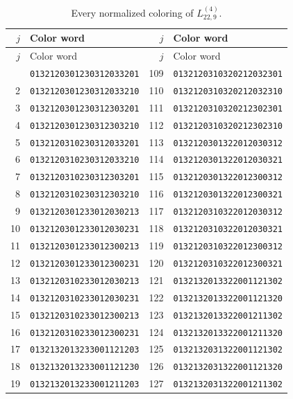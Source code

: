 \documentclass[aps,pra,reprint,superscriptaddress,longbibliography,nofootinbib,floatfix,10pt]{revtex4-2}
\theoremstyle{definition}
\begin{document}
\begin{longtable}{rl@{\qquad}rl}
\caption{Every normalized coloring of $L_{22,9}^{(4)}$.}\label{tab:colors-4f}\\\toprule $j$ & Color word & $j$ & Color word\\\midrule\endfirsthead
\toprule $j$ & Color word & $j$ & Color word\\\midrule\endhead\bottomrule\endfoot
1 & \texttt{0132120301230312033201} & 109 & \texttt{0132120310320212032301}\\
2 & \texttt{0132120301230312033210} & 110 & \texttt{0132120310320212032310}\\
3 & \texttt{0132120301230312303201} & 111 & \texttt{0132120310320212302301}\\
4 & \texttt{0132120301230312303210} & 112 & \texttt{0132120310320212302310}\\
5 & \texttt{0132120310230312033201} & 113 & \texttt{0132120301322012030312}\\
6 & \texttt{0132120310230312033210} & 114 & \texttt{0132120301322012030321}\\
7 & \texttt{0132120310230312303201} & 115 & \texttt{0132120301322012300312}\\
8 & \texttt{0132120310230312303210} & 116 & \texttt{0132120301322012300321}\\
9 & \texttt{0132120301233012030213} & 117 & \texttt{0132120310322012030312}\\
10 & \texttt{0132120301233012030231} & 118 & \texttt{0132120310322012030321}\\
11 & \texttt{0132120301233012300213} & 119 & \texttt{0132120310322012300312}\\
12 & \texttt{0132120301233012300231} & 120 & \texttt{0132120310322012300321}\\
13 & \texttt{0132120310233012030213} & 121 & \texttt{0132132013322001121302}\\
14 & \texttt{0132120310233012030231} & 122 & \texttt{0132132013322001121320}\\
15 & \texttt{0132120310233012300213} & 123 & \texttt{0132132013322001211302}\\
16 & \texttt{0132120310233012300231} & 124 & \texttt{0132132013322001211320}\\
17 & \texttt{0132132013233001121203} & 125 & \texttt{0132132031322001121302}\\
18 & \texttt{0132132013233001121230} & 126 & \texttt{0132132031322001121320}\\
19 & \texttt{0132132013233001211203} & 127 & \texttt{0132132031322001211302}\\

\end{longtable}
\end{document}
